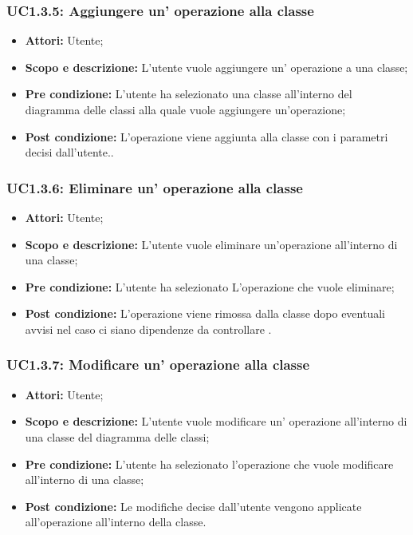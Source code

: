 \documentclass[a4paper]{report}
\begin{document}
\subsubsection{UC1.3.5: Aggiungere un' operazione alla classe}
\begin{itemize}
	\item \textbf{Attori:} Utente;
	\item \textbf{Scopo e descrizione: }L'utente vuole aggiungere un' operazione a una classe;
	\item \textbf{Pre condizione: }L'utente ha selezionato una classe all'interno del diagramma delle classi alla quale vuole aggiungere un'operazione;
	\item \textbf{Post condizione: }L'operazione viene aggiunta alla classe con i parametri decisi dall'utente..
\end{itemize}

\subsubsection{UC1.3.6: Eliminare un' operazione  alla classe}
\begin{itemize}
	\item \textbf{Attori:} Utente;
	\item \textbf{Scopo e descrizione: }L'utente vuole eliminare un'operazione all'interno di una classe;
	\item \textbf{Pre condizione: }L'utente ha selezionato L'operazione che vuole eliminare;
	\item \textbf{Post condizione: }L'operazione viene rimossa dalla classe dopo eventuali avvisi nel caso ci siano dipendenze da controllare .
\end{itemize}

\subsubsection{UC1.3.7: Modificare un' operazione alla classe}
\begin{itemize}
	\item \textbf{Attori:} Utente;
	\item \textbf{Scopo e descrizione: }L'utente vuole modificare un' operazione all'interno di una classe del diagramma delle classi;
	\item \textbf{Pre condizione: }L'utente ha selezionato l'operazione che vuole modificare all'interno di una classe;
	\item \textbf{Post condizione: }Le modifiche decise dall'utente vengono applicate all'operazione all'interno della classe.
\end{itemize}
\end{document}
